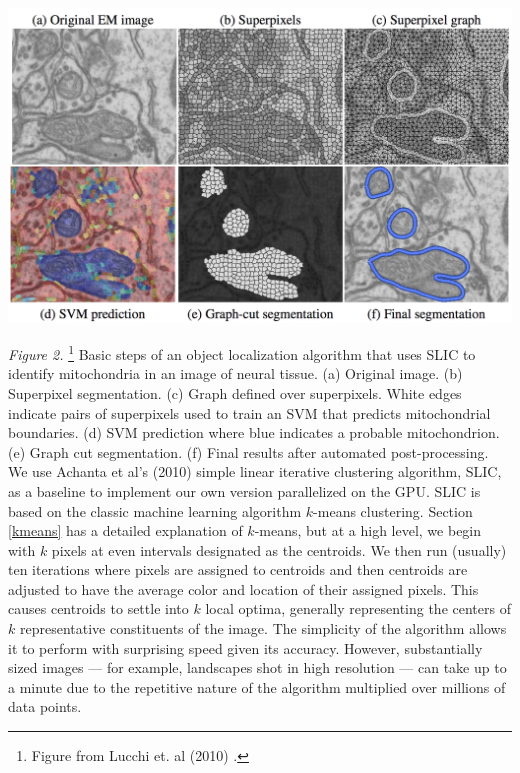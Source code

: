 \documentclass[11pt,twocolumn]{article}
\begin{document}
\newpage
\begin{center}
\includegraphics[width = \linewidth]{application.png} \\
\end{center}
\textit{Figure 2.} \footnote{Figure from Lucchi et. al (2010) \cite{medical}.} Basic steps of an object localization algorithm that uses SLIC to identify mitochondria in an image of neural tissue. (a) Original image. (b) Superpixel segmentation. (c) Graph defined over superpixels. White edges indicate pairs of superpixels used to train an SVM
that predicts mitochondrial boundaries. (d) SVM prediction where blue indicates a probable mitochondrion.
(e) Graph cut segmentation. (f) Final results after automated post-processing. \\

We use Achanta et al's (2010) simple linear iterative clustering algorithm, SLIC, as a baseline to implement our own version parallelized on the GPU. SLIC is based on the classic machine learning algorithm $k$-means clustering. Section \ref{kmeans} has a detailed explanation of $k$-means, but at a high level, we begin with $k$ pixels at even intervals designated as the centroids. We then run (usually) ten iterations where pixels are assigned to centroids and then centroids are adjusted to have the average color and location of their assigned pixels. This causes centroids to settle into $k$ local optima, generally representing the centers of $k$ representative constituents of the image. The simplicity of the algorithm allows it to perform with surprising speed given its accuracy. However, substantially sized images --- for example, landscapes shot in high resolution --- can take up to a minute due to the repetitive nature of the algorithm multiplied over millions of data points.
\end{document}

